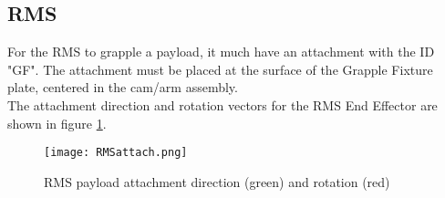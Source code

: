 \documentclass[Space_Shuttle_Vessel_Manual.tex]{subfiles}
\begin{document}
\begin{multicols*}{2}
\subsection{RMS}
For the RMS to grapple a payload, it much have an attachment with the ID "GF". The attachment must be placed at the surface of the Grapple Fixture plate, centered in the cam/arm assembly.
\\
The attachment direction and rotation vectors for the RMS End Effector are shown in figure \ref{fig:RMSattach}.
\begin{figure}[H]
  \centering
  \captionsetup{justification=centering}
  \texttt{[image: RMSattach.png]}
  \caption{RMS payload attachment direction (green) and rotation (red)}
  \label{fig:RMSattach}
\end{figure}


\end{multicols*}
\end{document}
